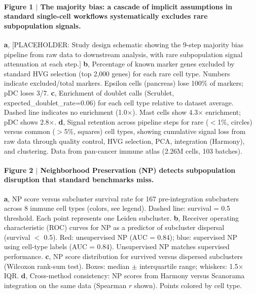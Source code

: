 
\paragraph{Figure 1 $|$ The majority bias: a cascade of implicit assumptions in standard single-cell workflows systematically excludes rare subpopulation signals.}
\textbf{a}, [PLACEHOLDER: Study design schematic showing the 9-step majority bias pipeline from raw data to downstream analysis, with rare subpopulation signal attenuation at each step.]
\textbf{b}, Percentage of known marker genes excluded by standard HVG selection (top 2,000 genes) for each rare cell type. Numbers indicate excluded/total markers. Epsilon cells (pancreas) lose 100\% of markers; pDC loses 3/7.
\textbf{c}, Enrichment of doublet calls (Scrublet, expected\_doublet\_rate=0.06) for each cell type relative to dataset average. Dashed line indicates no enrichment (1.0$\times$). Mast cells show 4.3$\times$ enrichment; pDC shows 2.8$\times$.
\textbf{d}, Signal retention across pipeline steps for rare ($<$1\%, circles) versus common ($>$5\%, squares) cell types, showing cumulative signal loss from raw data through quality control, HVG selection, PCA, integration (Harmony), and clustering. Data from pan-cancer immune atlas (2.26M cells, 103 batches).

\paragraph{Figure 2 $|$ Neighborhood Preservation (NP) detects subpopulation disruption that standard benchmarks miss.}
\textbf{a}, NP score versus subcluster survival rate for 167 pre-integration subclusters across 8 immune cell types (colors, see legend). Dashed line: survival = 0.5 threshold. Each point represents one Leiden subcluster.
\textbf{b}, Receiver operating characteristic (ROC) curves for NP as a predictor of subcluster dispersal (survival $<$ 0.5). Red: unsupervised NP (AUC = 0.84); blue: supervised NP using cell-type labels (AUC = 0.84). Unsupervised NP matches supervised performance.
\textbf{c}, NP score distribution for survived versus dispersed subclusters (Wilcoxon rank-sum test). Boxes: median $\pm$ interquartile range; whiskers: 1.5$\times$ IQR.
\textbf{d}, Cross-method consistency: NP scores from Harmony versus Scanorama integration on the same data (Spearman $r$ shown). Points colored by cell type.

